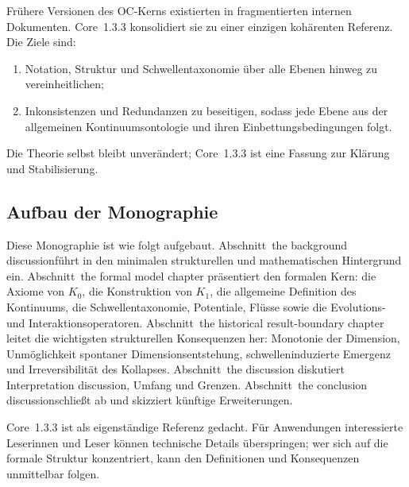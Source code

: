 Frühere Versionen des OC-Kerns existierten in fragmentierten internen Dokumenten. Core~1.3.3 konsolidiert sie zu einer einzigen kohärenten Referenz. Die Ziele sind:

\begin{enumerate}
    \item Notation, Struktur und Schwellentaxonomie über alle Ebenen hinweg zu vereinheitlichen;
    \item Inkonsistenzen und Redundanzen zu beseitigen, sodass jede Ebene aus der allgemeinen Kontinuumsontologie und ihren Einbettungsbedingungen folgt.
\end{enumerate}

Die Theorie selbst bleibt unverändert; Core~1.3.3 ist eine Fassung zur Klärung und Stabilisierung.

\subsection{Aufbau der Monographie}

Diese Monographie ist wie folgt aufgebaut.  
Abschnitt~the background discussionführt in den minimalen strukturellen und mathematischen Hintergrund ein.  
Abschnitt~the formal model chapter präsentiert den formalen Kern: die Axiome von \(K_0\), die Konstruktion von \(K_1\), die allgemeine Definition des Kontinuums, die Schwellentaxonomie, Potentiale, Flüsse sowie die Evolutions- und Interaktionsoperatoren.  
Abschnitt~the historical result-boundary chapter leitet die wichtigsten strukturellen Konsequenzen her: Monotonie der Dimension, Unmöglichkeit spontaner Dimensionsentstehung, schwelleninduzierte Emergenz und Irreversibilität des Kollapses.  
Abschnitt~the discussion diskutiert Interpretation discussion, Umfang und Grenzen.  
Abschnitt~the conclusion discussionschließt ab und skizziert künftige Erweiterungen.

Core~1.3.3 ist als eigenständige Referenz gedacht. Für Anwendungen interessierte Leserinnen und Leser können technische Details überspringen; wer sich auf die formale Struktur konzentriert, kann den Definitionen und Konsequenzen unmittelbar folgen.
